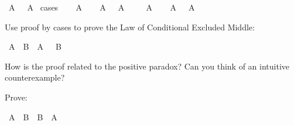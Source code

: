\begin{isabellebody}
\isamarkupfalse%
\ {\isachardoublequoteopen}A\ {\isasymor}\ {\isasymnot}\ A{\isachardoublequoteclose}\isanewline
%
\isadelimproof
%
\endisadelimproof
%
\isatagproof
{}\isamarkupfalse%
\ cases\isanewline
\ \ \isamarkupfalse%
\ {\isachardoublequoteopen}A{\isachardoublequoteclose}\isanewline
\ \ \isamarkupfalse%
\ {\isachardoublequoteopen}A\ {\isasymor}\ {\isasymnot}\ A{\isachardoublequoteclose}\isacommand{{\isachardot}{\isachardot}}\isamarkupfalse%
\isanewline
{}\isamarkupfalse%
\isanewline
\ \ \isamarkupfalse%
\ {\isachardoublequoteopen}{\isasymnot}\ A{\isachardoublequoteclose}\isanewline
\ \ \isamarkupfalse%
\ {\isachardoublequoteopen}A\ {\isasymor}\ {\isasymnot}\ A{\isachardoublequoteclose}\isacommand{{\isachardot}{\isachardot}}\isamarkupfalse%
\isanewline
{}\isamarkupfalse%
%
\endisatagproof
{\isafoldproof}%
%
\isadelimproof
%
\endisadelimproof
%
\begin{isamarkuptext}%
\begin{Exercise}[title = Conditional Excluded Middle] 
Use proof by cases to prove the Law of Conditional Excluded Middle: \end{Exercise}%
\end{isamarkuptext}\isamarkuptrue%
\isamarkupfalse%
\ {\isachardoublequoteopen}{\isacharparenleft}A\ {\isasymlongrightarrow}\ B{\isacharparenright}\ {\isasymor}\ {\isacharparenleft}A\ {\isasymlongrightarrow}\ {\isasymnot}\ B{\isacharparenright}{\isachardoublequoteclose}%
\isadelimproof
\ %
\endisadelimproof
%
\isatagproof
{}\isamarkupfalse%
%
\endisatagproof
{\isafoldproof}%
%
\isadelimproof
%
\endisadelimproof
%
\begin{isamarkuptext}%
How is the proof related to the positive paradox? Can you think of an intuitive counterexample?%
\end{isamarkuptext}\isamarkuptrue%
%
\begin{isamarkuptext}%
\begin{Exercise} Prove: \end{Exercise}%
\end{isamarkuptext}\isamarkuptrue%
\isamarkupfalse%
\ {\isachardoublequoteopen}{\isacharparenleft}A\ {\isasymlongrightarrow}\ B{\isacharparenright}\ {\isasymor}\ {\isacharparenleft}B\ {\isasymlongrightarrow}\ A{\isacharparenright}{\isachardoublequoteclose}%
\isadelimproof
\ %
\endisadelimproof
%
\isatagproof
{}\isamarkupfalse%
%
\endisatagproof

\end{isabellebody}
